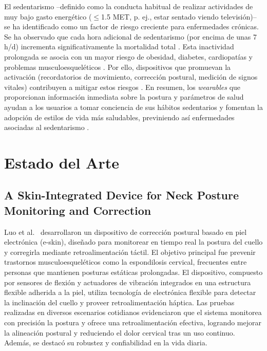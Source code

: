 \documentclass[manuscript,screen,review]{acmart}
\begin{document}
El sedentarismo –definido como la conducta habitual de realizar actividades de muy bajo gasto energético ($\leq$1.5 MET, p. ej., estar sentado viendo televisión)– se ha identificado como un factor de riesgo creciente para enfermedades crónicas. Se ha observado que cada hora adicional de sedentarismo (por encima de unas 7 h/d) incrementa significativamente la mortalidad total \cite{salman2019,mandili2022,canabrava2019}. Esta inactividad prolongada se asocia con un mayor riesgo de obesidad, diabetes, cardiopatías y problemas musculoesqueléticos \cite{mandili2022,sukatemin2025,widyaswara2024,priasmoro2023}. Por ello, dispositivos que promuevan la activación (recordatorios de movimiento, corrección postural, medición de signos vitales) contribuyen a mitigar estos riesgos \cite{franssen2022,hodgson2022,eijnde2022,howell2025}. En resumen, los \textit{wearables} que proporcionan información inmediata sobre la postura y parámetros de salud ayudan a los usuarios a tomar conciencia de sus hábitos sedentarios y fomentan la adopción de estilos de vida más saludables, previniendo así enfermedades asociadas al sedentarismo \cite{eijnde2022,franssen2022,hodgson2022}.


\section{Estado del Arte}

\subsection{A Skin-Integrated Device for Neck Posture Monitoring and Correction}
Luo et al.\ \cite{luo2023skin} desarrollaron un dispositivo de corrección postural basado en piel electrónica (e-skin), diseñado para monitorear en tiempo real la postura del cuello y corregirla mediante retroalimentación táctil. El objetivo principal fue prevenir trastornos musculoesqueléticos como la espondilosis cervical, frecuentes entre personas que mantienen posturas estáticas prolongadas. El dispositivo, compuesto por sensores de flexión y actuadores de vibración integrados en una estructura flexible adherida a la piel, utiliza tecnología de electrónica flexible para detectar la inclinación del cuello y proveer retroalimentación háptica. Las pruebas realizadas en diversos escenarios cotidianos evidenciaron que el sistema monitorea con precisión la postura y ofrece una retroalimentación efectiva, logrando mejorar la alineación postural y reduciendo el dolor cervical tras un uso continuo. Además, se destacó su robustez y confiabilidad en la vida diaria.
\end{document}
